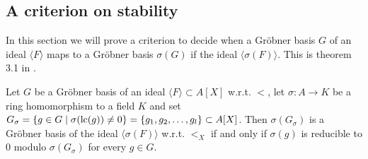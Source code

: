 \subsection{A criterion on stability}
In this section we will prove a criterion to decide when a Gröbner basis $G$ of an ideal $\langle F \rangle$ maps to a Gröbner basis $\sigma(G)$ if the ideal $\langle \sigma(F) \rangle$. This is theorem 3.1 in \cite{Kalkbrener}.

\begin{lemma}\label{lem:grb_iff_reduc_to_z}
  Let $G$ be a Gröbner basis of an ideal $\langle F \rangle \subset A[X]$ w.r.t. $<$, let $\sigma : A \to K$ be a ring homomorphism to a field $K$ and set $G_{\sigma} = \{g \in G \mid \sigma(\operatorname{lc}(g)) \neq 0\} = \{g_{1}, g_{2}, \dots, g_{l}\} \subset A[X]$. Then $\sigma(G_{\sigma})$ is a Gröbner basis of the ideal $\langle \sigma(F) \rangle$ w.r.t. $<_{X}$ if and only if $\sigma(g)$ is reducible to 0 modulo $\sigma(G_{\sigma})$ for every $g \in G$.
\end{lemma}
